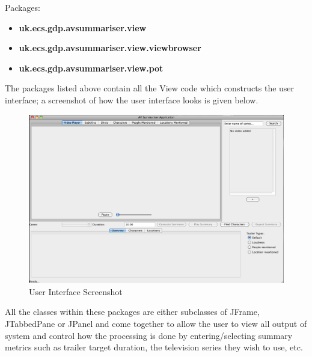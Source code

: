 Packages: 
\begin{itemize}
	\item{\textbf{uk.ecs.gdp.avsummariser.view}}
	\item{\textbf{uk.ecs.gdp.avsummariser.view.viewbrowser}}
	\item{\textbf{uk.ecs.gdp.avsummariser.view.pot}}
\end{itemize}
The packages listed above contain all the View code which constructs the user interface; a screenshot of how the user interface looks is given below.

\begin{figure}[h1]
\begin{center}
 \includegraphics[trim = 0mm 0mm 0mm 0mm, clip,
 scale=0.35]{Images/UIScreenshot.png}
  \caption{User Interface Screenshot}
 \end{center}
\end{figure}

All the classes within these packages are either subclasses of JFrame, JTabbedPane or JPanel and come together to allow the user to view all output of system and control how the processing is done by entering/selecting summary metrics such as trailer target duration, the television series they wish to use, etc.
